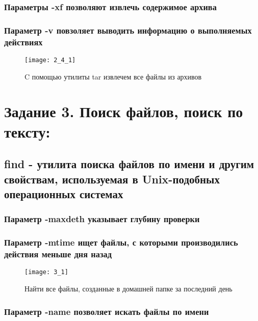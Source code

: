 \subsubsection{Параметры -xf позволяют извлечь содержимое архива}
\subsubsection{Параметр -v повзоляет выводить информацию о выполняемых действиях}

\begin{figure}[H]
	\begin{center}
		\texttt{[image: 2\_4\_1]}
		\caption{C помощью утилиты tar извлечем все файлы из архивов} 
		\label{pic:pic_1} %
	\end{center}
\end{figure}

\newpage

\section{Задание 3. Поиск файлов, поиск по тексту:}

\subsection{find - утилита поиска файлов по имени и другим свойствам, используемая в Unix-подобных операционных системах}

\subsubsection{Параметр -maxdeth указывает глубину проверки}
\subsubsection{Параметр -mtime ищет файлы, с которыми производились действия меньше дня назад}

\begin{figure}[H]
	\begin{center}
		\texttt{[image: 3\_1]}
		\caption{Найти все файлы, созданные в домашней папке за последний день} 
		\label{pic:pic_1} %
	\end{center}
\end{figure}

\subsubsection{Параметр -name позволяет искать файлы по имени}

